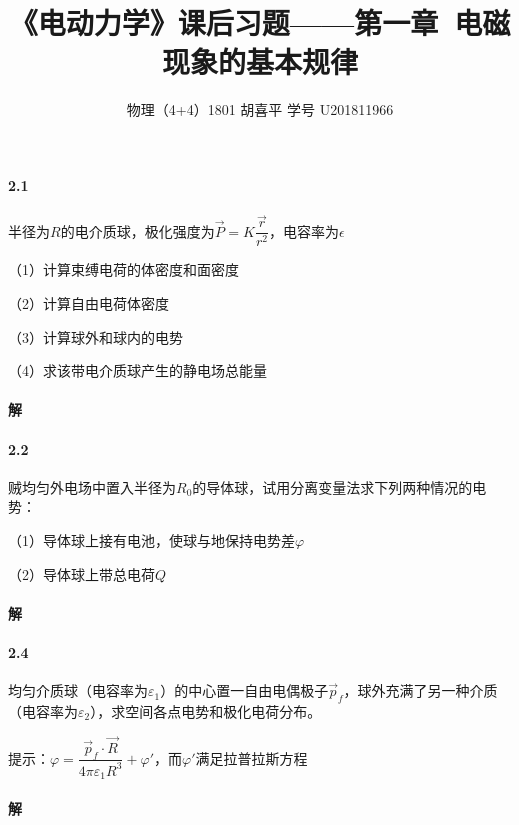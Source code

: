 \documentclass{article}
\author{物理（4+4）1801 \quad 胡喜平 \quad 学号 U201811966}
\affil{网站 https://hxp.plus/ \quad 邮件 hxp201406@gmail.com}
\title{《电动力学》课后习题——第一章\ 电磁现象的基本规律}
\begin{document}
\maketitle\thispagestyle{fancy}

\paragraph{2.1}

半径为$R$的电介质球，极化强度为$\vec{P}=K \dfrac{\vec{r}}{r^2} $，电容率为$\epsilon$

（1）计算束缚电荷的体密度和面密度

（2）计算自由电荷体密度

（3）计算球外和球内的电势

（4）求该带电介质球产生的静电场总能量

\paragraph{解}



\paragraph{2.2}

贼均匀外电场中置入半径为$R_0$的导体球，试用分离变量法求下列两种情况的电势：

（1）导体球上接有电池，使球与地保持电势差$\varphi$

（2）导体球上带总电荷$Q$

\paragraph{解}



\paragraph{2.4}

均匀介质球（电容率为$\varepsilon_1$）的中心置一自由电偶极子$\vec{p}_f$，球外充满了另一种介质（电容率为$\varepsilon_2$），求空间各点电势和极化电荷分布。

提示：$\varphi = \dfrac{\vec{p}_f \cdot \vec{R}}{ 4 \pi \varepsilon_1 R^3} + \varphi' $，而$\varphi'$满足拉普拉斯方程

\paragraph{解}
\end{document}
